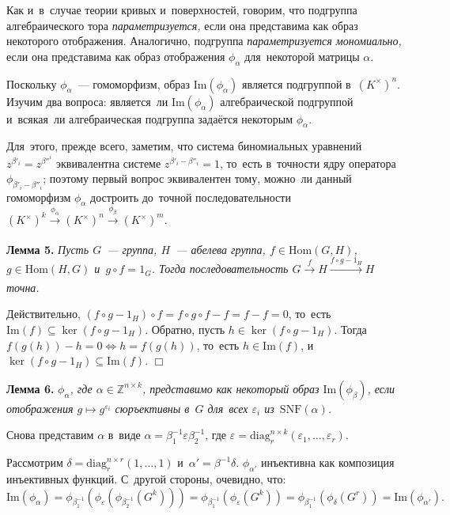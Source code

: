 \documentclass[twoside]{article}
\begin{document}
Как и~в~случае теории кривых и~поверхностей, говорим, что подгруппа алгебраического тора \textit{параметризуется,}
если она представима как образ некоторого отображения. Аналогично, подгруппа \textit{параметризуется мономиально,}
если она представима как образ отображения $\phi_\alpha$ для~некоторой матрицы $\alpha$.

Поскольку $\phi_\alpha$~— гомоморфизм, образ $\mathrm{Im}(\phi_\alpha)$ является подгруппой в~$(K^\times)^n$.
Изучим два вопроса: является~ли $\mathrm{Im}(\phi_\alpha)$ алгебраической подгруппой и~всякая~ли алгебраическая подгруппа задаётся некоторым $\phi_\alpha$.

Для~этого, прежде всего, заметим, что система биномиальных уравнений $z^{\beta'_i} = z^{\beta''^i}$ эквивалентна
системе $z^{\beta'_i - \beta''_i} = 1$, то~есть в~точности ядру оператора $\phi_{\beta'_i - \beta''_i}$;
поэтому первый вопрос эквивалентен тому, можно~ли данный гомоморфизм $\phi_\alpha$ достроить
до~точной последовательности $(K^\times)^k \xrightarrow[]{\phi_\alpha} (K^\times)^n \xrightarrow[]{\phi_\beta} (K^\times)^m$.

\medskip\noindent\textbf{Лемма 5.}\emph{
    Пусть $G$~— группа, $H$~— абелева группа, $f \in \mathrm{Hom}(G, H)$, $g \in \mathrm{Hom}(H, G)$ и~$g \circ f = 1_G$.
    Тогда последовательность $G \xrightarrow[]{f} H \xrightarrow[]{f \circ g - 1_H} H$ точна.
}\medskip

    Действительно, $(f \circ g - 1_H) \circ f = f \circ g \circ f - f = f - f = 0$, то~есть $\mathrm{Im}(f) \subseteq \ker(f \circ g - 1_H)$. 
    Обратно, пусть $h \in \ker(f \circ g - 1_H)$. Тогда $f(g(h)) - h = 0 \Leftrightarrow h = f(g(h))$, то~есть $h \in \mathrm{Im}(f)$,
    и~$\ker(f \circ g - 1_H) \subseteq \mathrm{Im}(f)$.
\hfill$\Box$\medskip

\medskip\noindent\textbf{Лемма 6.}\emph{
    $\phi_\alpha$, где $\alpha \in \mathbb{Z}^{n \times k}$, представимо как некоторый образ $\mathrm{Im}(\phi_\beta)$,
    если отображения $g \mapsto g^{\varepsilon_i}$ сюръективны в~$G$ для~всех $\varepsilon_i$ из~$\mathrm{SNF}(\alpha)$.
}\medskip

    Снова представим $\alpha$ в~виде $\alpha = \beta_1^{-1} \varepsilon \beta_2^{-1}$, где
    $
        \varepsilon = \mathrm{diag}^{n \times k}_r(\varepsilon_1, \ldots, \varepsilon_r).
    $

    Рассмотрим $\delta = \mathrm{diag}^{n \times r}_r(1, \ldots, 1)$ и~$\alpha' = \beta^{-1} \delta$.
    $\phi_{\alpha'}$ инъективна как композиция инъективных функций. С~другой стороны, очевидно, что:
    $$
        \mathrm{Im}(\phi_\alpha) = \phi_{\beta_1^{-1}} (\phi_\varepsilon (\phi_{\beta_2^{-1}} (G^k)))
                                 = \phi_{\beta_1^{-1}} (\phi_\varepsilon (G^k))
                                 = \phi_{\beta_1^{-1}} (\phi_{\delta} (G^r))
                                 = \mathrm{Im}(\phi_{\alpha'}).
    $$
\end{document}
